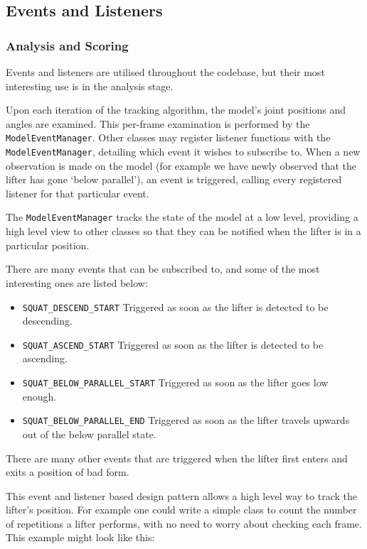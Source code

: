 \subsection{Events and Listeners}
\label{sec:listeners}

\subsubsection{Analysis and Scoring}

Events and listeners are utilised throughout the codebase, but their most interesting use is in the analysis stage.

Upon each iteration of the tracking algorithm, the model's joint positions and angles are examined. This per-frame examination is performed by the \texttt{ModelEventManager}. Other classes may register listener functions with the \texttt{ModelEventManager}, detailing which event it wishes to subscribe to. When a new observation is made on the model (for example we have newly observed that the lifter has gone `below parallel'), an event is triggered, calling every registered listener for that particular event.

The \texttt{ModelEventManager} tracks the state of the model at a low level, providing a high level view to other classes so that they can be notified when the lifter is in a particular position.

There are many events that can be subscribed to, and some of the most interesting ones are listed below:

\begin{itemize}
	\item \texttt{SQUAT\_DESCEND\_START} Triggered as soon as the lifter is detected to be descending.
	\item \texttt{SQUAT\_ASCEND\_START} Triggered as soon as the lifter is detected to be ascending.
	\item \texttt{SQUAT\_BELOW\_PARALLEL\_START} Triggered as soon as the lifter goes low enough.
	\item \texttt{SQUAT\_BELOW\_PARALLEL\_END} Triggered as soon as the lifter travels upwards out of the below parallel state.
\end{itemize}

There are many other events that are triggered when the lifter first enters and exits a position of bad form.

This event and listener based design pattern allows a high level way to track the lifter's position. For example one could write a simple class to count the number of repetitions a lifter performs, with no need to worry about checking each frame. This example might look like this:

